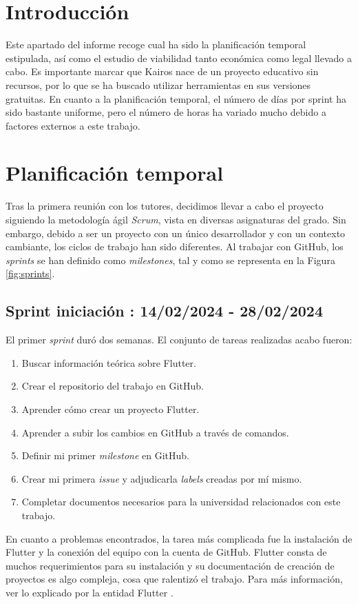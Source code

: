 
\section{Introducción}

	Este apartado del informe recoge cual ha sido la planificación temporal estipulada, así como el estudio de viabilidad tanto económica como legal llevado a cabo. Es importante marcar que Kairos nace de un proyecto educativo sin recursos, por lo que se ha buscado utilizar herramientas en sus versiones gratuitas. En cuanto a la planificación temporal, el número de días por sprint ha sido bastante uniforme, pero el número de horas ha variado mucho debido a factores externos a este trabajo.	

\section{Planificación temporal}

	Tras la primera reunión con los tutores, decidimos llevar a cabo el proyecto siguiendo la metodología ágil \emph{Scrum}, vista en diversas asignaturas del grado. Sin embargo, debido a ser un proyecto con un único desarrollador y con un contexto cambiante, los ciclos de trabajo han sido diferentes. Al trabajar con GitHub, los \emph{sprints} se han definido como \emph{milestones}, tal y como se representa en la Figura \ref{fig:sprints}.
	

\subsection{Sprint iniciación : 14/02/2024 - 28/02/2024}

	El primer \emph{sprint} duró dos semanas. El conjunto de tareas realizadas acabo fueron:
	\begin{enumerate}
		\item Buscar información teórica sobre Flutter.
		\item Crear el repositorio del trabajo en GitHub.
		\item Aprender cómo crear un proyecto Flutter.
		\item Aprender a subir los cambios en GitHub a través de comandos.
		\item Definir mi primer \emph{milestone} en GitHub.
		\item Crear mi primera \emph{issue} y adjudicarla \emph{labels} creadas por mí mismo.
		\item Completar documentos necesarios para la universidad relacionados con este trabajo.
	\end{enumerate}
	En cuanto a problemas encontrados, la tarea más complicada fue la instalación de Flutter y la conexión del equipo con la cuenta de GitHub. Flutter consta de muchos requerimientos para su instalación y su documentación de creación de proyectos es algo compleja, cosa que ralentizó el trabajo. Para más información, ver lo explicado por la entidad Flutter \cite{flutter}.
	
